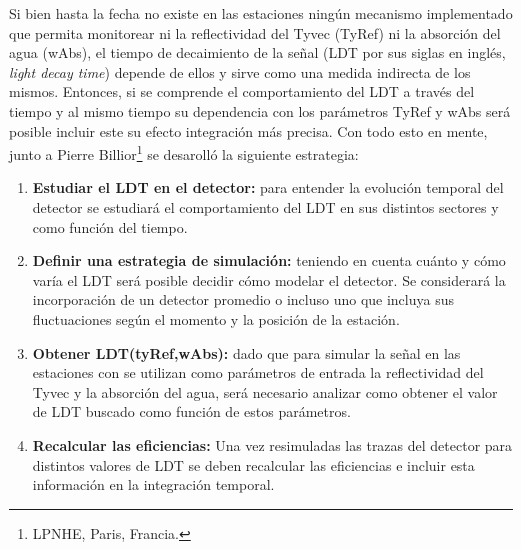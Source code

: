 	Si bien hasta la fecha no existe en las estaciones ningún mecanismo implementado que permita monitorear ni la reflectividad del Tyvec (TyRef) ni la absorción del agua (wAbs), el tiempo de decaimiento de la señal (LDT por sus siglas en inglés, \emph{light decay time}) depende de ellos y sirve como una medida indirecta de los mismos.
	Entonces, si se comprende el comportamiento del LDT a trav\'es del tiempo y al mismo tiempo su dependencia con los parámetros TyRef y wAbs ser\'a posible incluir este su efecto integraci\'on m\'as precisa.
	Con todo esto en mente, junto a Pierre Billior\footnote{LPNHE, Paris, Francia.} se desaroll\'o la siguiente estrategia:
	\begin{enumerate}
	 \item \textbf{Estudiar el LDT en el detector:} para entender la evolución temporal del detector se estudiar\'a el comportamiento del LDT en sus distintos sectores y como función del tiempo.
	 \item \textbf{Definir una estrategia de simulación:} teniendo en cuenta cuánto y cómo varía el LDT ser\'a posible decidir cómo modelar el detector. Se considerar\'a la incorporaci\'on de un detector promedio o incluso uno que incluya sus fluctuaciones seg\'un el momento y la posición de la estación.
	 \item \textbf{Obtener LDT(tyRef,wAbs):} dado que para simular la señal en las estaciones con \Offline{} se utilizan como parámetros de entrada la reflectividad del Tyvec y la absorción del agua, será necesario analizar como obtener el valor de LDT buscado como función de estos parámetros.
	 \item \textbf{Recalcular las eficiencias:} Una vez resimuladas las trazas del detector para distintos valores de LDT se deben recalcular las eficiencias e incluir esta información en la integración temporal.
	\end{enumerate}

